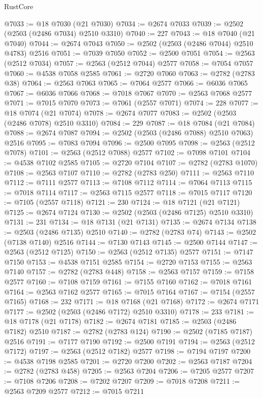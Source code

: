 \begin{lexlean}{RustCore}
\begin{coremodule}
@7033 := @18 @7030 (@21 @7030)
@7034 := @2674 @7033
@7039 := @2502 (@2503 (@2486 @7034) @2510 @3310)
@7040 := 227
@7043 := @18 @7040 (@21 @7040)
@7044 := @2674 @7043
@7050 := @2502 (@2503 (@2486 @7044) @2510 @4783) @2516
@7051 := @7039 @7050
@7052 := @2500 @7051
@7054 := @2563 (@2512 @7034)
@7057 := @2563 (@2512 @7044) @2577
@7058 := @7054 @7057
@7060 := @4538 @7058 @2585
@7061 := @2720 @7060
@7063 := @2782 (@2783 @38)
@7064 := @2563 @7063
@7065 := @7064 @2577
@7066 := @6036 @7065
@7067 := @6036 @7066
@7068 := @7018 @7067
@7070 := @2563 @7068 @2577
@7071 := @7015 @7070
@7073 := @7061 (@2557 @7071)
@7074 := 228
@7077 := @18 @7074 (@21 @7074)
@7078 := @2674 @7077
@7083 := @2502 (@2503 (@2486 @7078) @2510 @3310)
@7084 := 229
@7087 := @18 @7084 (@21 @7084)
@7088 := @2674 @7087
@7094 := @2502 (@2503 (@2486 @7088) @2510 @7063) @2516
@7095 := @7083 @7094
@7096 := @2500 @7095
@7098 := @2563 (@2512 @7078)
@7101 := @2563 (@2512 @7088) @2577
@7102 := @7098 @7101
@7104 := @4538 @7102 @2585
@7105 := @2720 @7104
@7107 := @2782 (@2783 @1070)
@7108 := @2563 @7107
@7110 := @2782 (@2783 @250)
@7111 := @2563 @7110
@7112 := @7111 @2577
@7113 := @7108 @7112
@7114 := @7064 @7113
@7115 := @7018 @7114
@7117 := @2563 @7115 @2577
@7118 := @7015 @7117
@7120 := @7105 (@2557 @7118)
@7121 := 230
@7124 := @18 @7121 (@21 @7121)
@7125 := @2674 @7124
@7130 := @2502 (@2503 (@2486 @7125) @2510 @3310)
@7131 := 231
@7134 := @18 @7131 (@21 @7131)
@7135 := @2674 @7134
@7138 := @2503 (@2486 @7135) @2510
@7140 := @2782 (@2783 @74)
@7143 := @2502 (@7138 @7140) @2516
@7144 := @7130 @7143
@7145 := @2500 @7144
@7147 := @2563 (@2512 @7125)
@7150 := @2563 (@2512 @7135) @2577
@7151 := @7147 @7150
@7153 := @4538 @7151 @2585
@7154 := @2720 @7153
@7155 := @2563 @7140
@7157 := @2782 (@2783 @448)
@7158 := @2563 @7157
@7159 := @7158 @2577
@7160 := @7108 @7159
@7161 := @7155 @7160
@7162 := @7018 @7161
@7164 := @2563 @7162 @2577
@7165 := @7015 @7164
@7167 := @7154 (@2557 @7165)
@7168 := 232
@7171 := @18 @7168 (@21 @7168)
@7172 := @2674 @7171
@7177 := @2502 (@2503 (@2486 @7172) @2510 @3310)
@7178 := 233
@7181 := @18 @7178 (@21 @7178)
@7182 := @2674 @7181
@7185 := @2503 (@2486 @7182) @2510
@7187 := @2782 (@2783 @124)
@7190 := @2502 (@7185 @7187) @2516
@7191 := @7177 @7190
@7192 := @2500 @7191
@7194 := @2563 (@2512 @7172)
@7197 := @2563 (@2512 @7182) @2577
@7198 := @7194 @7197
@7200 := @4538 @7198 @2585
@7201 := @2720 @7200
@7202 := @2563 @7187
@7204 := @2782 (@2783 @458)
@7205 := @2563 @7204
@7206 := @7205 @2577
@7207 := @7108 @7206
@7208 := @7202 @7207
@7209 := @7018 @7208
@7211 := @2563 @7209 @2577
@7212 := @7015 @7211

\end{coremodule}
\end{lexlean}
